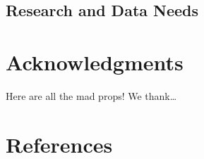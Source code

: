 \documentclass[11pt,
  english,
  letterpaper,
]{article}
\begin{document}
\hypertarget{research-and-data-needs-1}{%
\subsection{Research and Data Needs}\label{research-and-data-needs-1}}

\hypertarget{acknowledgments}{%
\section{Acknowledgments}\label{acknowledgments}}

Here are all the mad props! We thank\ldots{}

\clearpage

\hypertarget{references}{%
\section{References}\label{references}}
\end{document}
